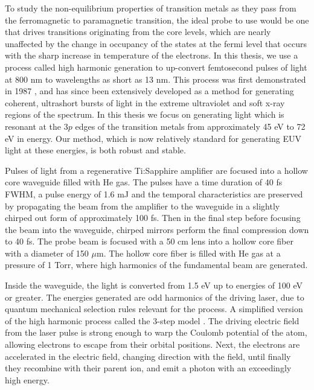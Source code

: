 To study the non-equilibrium  properties of transition metals as they pass from the ferromagnetic to paramagnetic transition, the ideal probe to use would be one that drives transitions originating from the core levels, which are nearly unaffected by the change in occupancy of the states at the fermi level that occurs with the sharp increase in temperature of the electrons. In this thesis, we use a process called high harmonic generation to up-convert femtosecond pulses of light at 800 nm to wavelengths as short as 13 nm. This process was first demonstrated in 1987 \cite{McPherson1987,Manus2002}, and has since been extensively developed \cite{J.J.MacklinJ.D.Kmetec1993,LHuillier1993} as a method for generating coherent, ultrashort bursts of light in the extreme ultraviolet and soft x-ray regions of the spectrum. In this thesis we focus on generating light which is resonant at the $3p$ edges of the transition metals from approximately 45 eV to 72 eV in energy. Our method, which is now relatively standard for generating EUV light at these energies, is both robust and stable.

Pulses of light from a regenerative Ti:Sapphire amplifier are focused into a hollow core waveguide filled with He gas. The pulses have a time duration of 40 fs FWHM, a pulse energy of 1.6 mJ and the temporal characteristics are preserved by propagating the beam from the amplifier to the waveguide in a slightly chirped out form of approximately 100 fs. Then in the final step before focusing the beam into the waveguide, chirped mirrors perform the final compression down to 40 fs. The probe beam is focused with a 50 cm lens into a hollow core fiber with a diameter of 150 $\mu$m. The hollow core fiber is filled with He gas at a pressure of 1 Torr, where high harmonics of the fundamental beam are generated. 

Inside the waveguide, the light is converted from 1.5 eV up to energies of 100 eV or greater. The energies generated are odd harmonics of the driving laser, due to quantum mechanical selection rules relevant for the process. A simplified version of the high harmonic process called the 3-step model \cite{B.Corkum1993}. The driving electric field from the laser pulse is strong enough to warp the Coulomb potential of the atom, allowing electrons to escape from their orbital positions. Next, the electrons are accelerated in the electric field, changing direction with the field, until finally they recombine with their parent ion, and emit a photon with an exceedingly high energy. 

